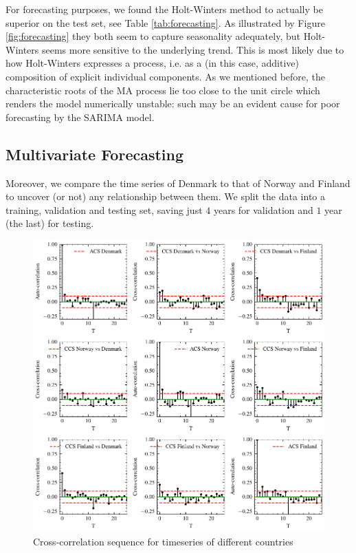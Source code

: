 \documentclass[conference]{IEEEtran}
\begin{document}
For forecasting purposes, we found the Holt-Winters method to actually be superior on the test set, see Table \ref{tab:forecasting}. As illustrated by Figure \ref{fig:forecasting} they both seem to capture seasonality adequately, but Holt-Winters seems more sensitive to the underlying trend. This is most likely due to how Holt-Winters expresses a process, i.e. as a (in this case, additive) composition of explicit individual components. As we mentioned before, the characteristic roots of the MA process lie too close to the unit circle which renders the model numerically unstable: such may be an evident cause for poor forecasting by the SARIMA model.
\subsection{Multivariate Forecasting}

Moreover, we compare the time series of Denmark to that of Norway and Finland to uncover (or not) any relationship between them. We split the data into a training, validation and testing set, saving just $4$ years for validation and $1$ year (the last) for testing.

\begin{figure}[hbtp]
    \centering
    \includegraphics{../figs/cross_correlation_seq.pdf}
    \caption{Cross-correlation sequence for timeseries of different countries}
    \label{fig:cross_correlation_seq}
\end{figure}
\end{document}
